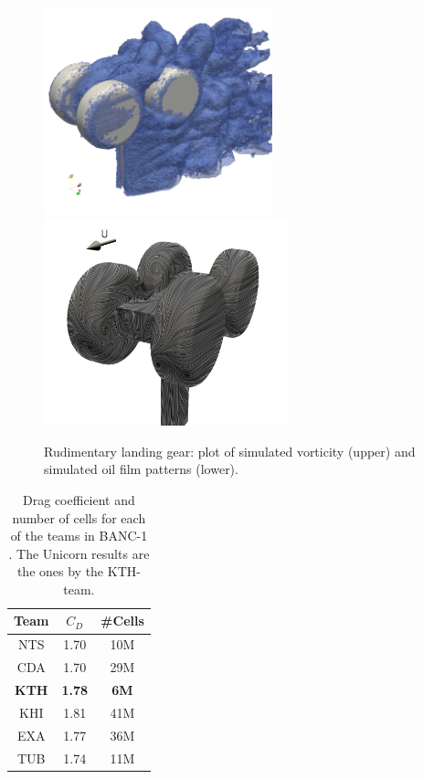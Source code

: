 \begin{figure}
\centering
\includegraphics[height=6cm]{unfinished/hoffman-1/png/rlg_vorticity}
\includegraphics[height=6cm]{unfinished/hoffman-1/png/oilfilm_back_sim}
\caption{Rudimentary landing gear: plot of simulated vorticity (upper) and simulated oil film patterns (lower).}
\label{rlg}      
\end{figure}

\begin{table}[hbt]
\begin{center}
\begin{tabular}{|c|cc|}
\hline
Team & $C_D$ & \#Cells \\
\hline
NTS &    1.70 &    10M \\
CDA  &   1.70  &   29M \\
\textbf{KTH}  &   \textbf{1.78}  &   \textbf{6M}\\
KHI  &   1.81  &   41M \\
EXA  &   1.77  &   36M \\
TUB  &   1.74  &   11M \\
\hline      
\end{tabular}
\caption{\label{tab:hoffman-1-rlg} Drag coefficient and number of cells for each of the teams in BANC-1 \cite{SpalartMejia2011}. The Unicorn results are the ones by the KTH-team.}
\end{center}
\end{table}

